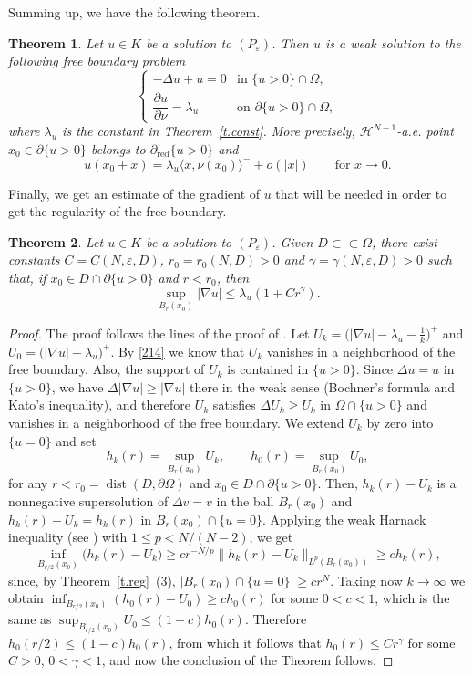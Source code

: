 \documentclass[11pt]{amsart}
\newtheorem{theorem}{Theorem}[section]
\theoremstyle{definition}
\theoremstyle{remark}
\numberwithin{equation}{section}
\newcommand{\cH}{\mathcal{H}}
\DeclareMathOperator{\dist}{dist}
\newcommand{\red}{\mathrm{red}}
\begin{document}
Summing up, we have the following theorem.

\begin{theorem}\label{t.weak}
Let $u\in K$ be a solution to $(P_\varepsilon)$. Then $u$ is a weak solution to the following free boundary problem
\[
\begin{cases}
-\Delta u+u=0 & \text{in }\{u>0\}\cap\Omega,\\[2pt]
\dfrac{\partial u}{\partial\nu}=\lambda_u & \text{on }\partial\{u>0\}\cap\Omega,
\end{cases}
\]
where $\lambda_u$ is the constant in Theorem~\ref{t.const}. More precisely, $\cH^{N-1}$-a.e. point $x_0\in\partial\{u>0\}$ belongs to $\partial_\red\{u>0\}$ and
\[
u(x_0+x)=\lambda_u\langle x,\nu(x_0)\rangle^-+o(|x|)\qquad\text{for } x\to0.
\]
\end{theorem}

Finally, we get an estimate of the gradient of $u$ that will be needed in order to get the regularity of the free boundary.

\begin{theorem}\label{t.grad}
Let $u\in K$ be a solution to $(P_\varepsilon)$. Given $D\subset\subset\Omega$, there exist constants $C=C(N,\varepsilon,D)$, $r_0=r_0(N,D)>0$ and $\gamma=\gamma(N,\varepsilon,D)>0$ such that, if $x_0\in D\cap\partial\{u>0\}$ and $r<r_0$, then
\[
\sup_{B_r(x_0)}|\nabla u|\le\lambda_u(1+Cr^\gamma).
\]
\end{theorem}

\begin{proof}
The proof follows the lines of the proof of \cite[Theorem~4.1]{ACF}. Let $U_k=\big(|\nabla u|-\lambda_u-\frac1k\big)^+$ and $U_0=\big(|\nabla u|-\lambda_u\big)^+$. By \eqref{214} we know that $U_k$ vanishes in a neighborhood of the free boundary. Also, the support of $U_k$ is contained in $\{u>0\}$. Since $\Delta u=u$ in $\{u>0\}$, we have $\Delta|\nabla u|\ge|\nabla u|$ there in the weak sense (Bochner's formula and Kato's inequality), and therefore $U_k$ satisfies $\Delta U_k\ge U_k$ in $\Omega\cap\{u>0\}$ and vanishes in a neighborhood of the free boundary. We extend $U_k$ by zero into $\{u=0\}$ and set
\[
h_k(r)=\sup_{B_r(x_0)}U_k,\qquad h_0(r)=\sup_{B_r(x_0)}U_0,
\]
for any $r<r_0=\dist(D,\partial\Omega)$ and $x_0\in D\cap\partial\{u>0\}$. Then, $h_k(r)-U_k$ is a nonnegative supersolution of $\Delta v=v$ in the ball $B_r(x_0)$ and $h_k(r)-U_k=h_k(r)$ in $B_r(x_0)\cap\{u=0\}$. Applying the weak Harnack inequality (see \cite[p.~246]{GT}) with $1\le p<N/(N-2)$, we get
\[
\inf_{B_{r/2}(x_0)}\big(h_k(r)-U_k\big)\ge cr^{-N/p}\|h_k(r)-U_k\|_{L^p(B_r(x_0))}\ge ch_k(r),
\]
since, by Theorem~\ref{t.reg}~(3), $|B_r(x_0)\cap\{u=0\}|\ge cr^N$. Taking now $k\to\infty$ we obtain $\inf_{B_{r/2}(x_0)}(h_0(r)-U_0)\ge ch_0(r)$ for some $0<c<1$, which is the same as $\sup_{B_{r/2}(x_0)}U_0\le(1-c)h_0(r)$. Therefore $h_0(r/2)\le(1-c)h_0(r)$, from which it follows that $h_0(r)\le Cr^\gamma$ for some $C>0$, $0<\gamma<1$, and now the conclusion of the Theorem follows.
\end{proof}
\end{document}
